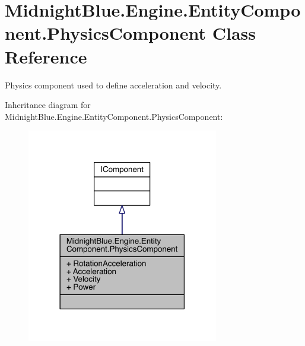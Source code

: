 \hypertarget{class_midnight_blue_1_1_engine_1_1_entity_component_1_1_physics_component}{}\section{Midnight\+Blue.\+Engine.\+Entity\+Component.\+Physics\+Component Class Reference}
\label{class_midnight_blue_1_1_engine_1_1_entity_component_1_1_physics_component}


Physics component used to define acceleration and velocity.  




Inheritance diagram for Midnight\+Blue.\+Engine.\+Entity\+Component.\+Physics\+Component\+:
\nopagebreak
\begin{figure}[H]
\begin{center}
\leavevmode
\includegraphics[width=237pt]{class_midnight_blue_1_1_engine_1_1_entity_component_1_1_physics_component__inherit__graph}
\end{center}
\end{figure}


